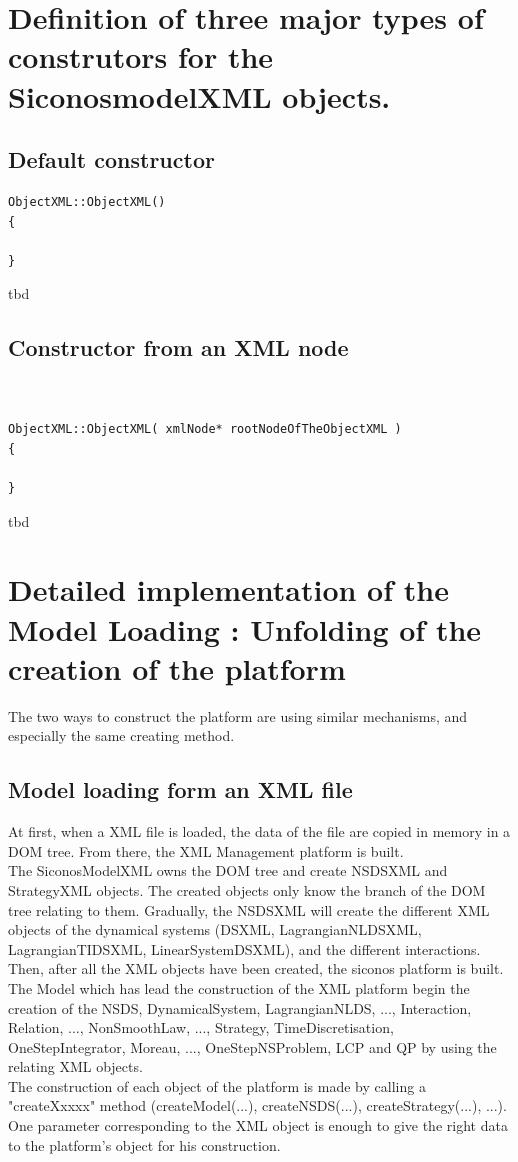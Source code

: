 \clearpage
\section{Definition of three major types of construtors for the SiconosmodelXML objects.}


\subsection{Default constructor}

\begin{verbatim}
ObjectXML::ObjectXML() 
{

}
\end{verbatim}
\ac{tbd}



\subsection{Constructor from an XML node}


\begin{verbatim}


ObjectXML::ObjectXML( xmlNode* rootNodeOfTheObjectXML ) 
{

}
\end{verbatim}
\ac{tbd}
\clearpage
\section{Detailed implementation of the Model Loading : Unfolding of the creation of the platform}
The two ways to construct the platform are using similar mechanisms, and especially the same creating
method.



\subsection{Model loading form an XML file}


At first, when a XML file is loaded, the data of the file are copied in memory in a DOM tree. From
there, the XML Management platform is built.\\
The SiconosModelXML owns the DOM tree and create NSDSXML and StrategyXML objects. The created objects
only know the branch of the DOM tree relating to them. Gradually, the NSDSXML will create the
different XML objects of the dynamical systems (DSXML, LagrangianNLDSXML, LagrangianTIDSXML,
LinearSystemDSXML), and the different interactions.\\
Then, after all the XML objects have been created, the \ac{siconos} platform is built.\\
The Model which has lead the construction of the XML platform begin the creation of the NSDS,
DynamicalSystem, LagrangianNLDS, ..., Interaction, Relation, ..., NonSmoothLaw, ..., Strategy,
TimeDiscretisation, OneStepIntegrator, Moreau, ..., OneStepNSProblem, LCP and QP by using the
relating XML objects.\\
The construction of each object of the platform is made by calling a
"createXxxxx" method (createModel(...), createNSDS(...), createStrategy(...), ...). One parameter
corresponding to the XML object is enough to give the right data to the platform's object for his
construction.


